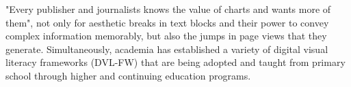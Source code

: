 "Every publisher and journalists knows the value of charts and wants more of them"\cite{DNIFund2018}, not only for aesthetic breaks in text blocks and their power to convey complex information memorably, but also the jumps in page views that they generate\cite{Meeks2019,storiesGL}. %
Simultaneously, academia has established a variety of digital visual literacy frameworks (DVL-FW) that are being adopted and taught from primary school through higher and continuing education programs. %

